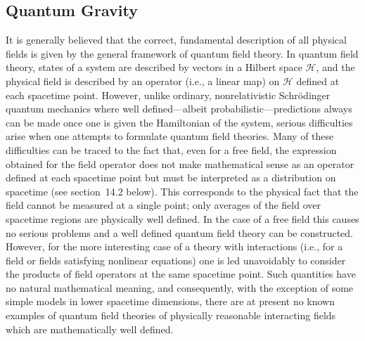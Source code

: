 
\subsection{Quantum Gravity}\label{sec:14.1}

It is generally believed that the correct, fundamental description of all physical
fields is given by the general framework of quantum field theory. In quantum field
theory, states of a system are described by vectors in a Hilbert space \(\mathcal H\), and the
physical field is described by an operator (i.e., a linear map) on \(\mathcal H\) defined at each
spacetime point. However, unlike ordinary, nonrelativistic Schrödinger quantum
mechanics where well defined---albeit probabilistic---predictions always can be
made once one is given the Hamiltonian of the system, serious difficulties arise when
one attempts to formulate quantum field theories. Many of these difficulties can be
traced to the fact that, even for a free field, the expression obtained for the field
operator does not make mathematical sense as an operator defined at each spacetime
point but must be interpreted as a distribution on spacetime (see section~14.2 below).
This corresponds to the physical fact that the field cannot be measured at a single
point; only averages of the field over spacetime regions are physically well defined.
In the case of a free field this causes no serious problems and a well defined quantum
field theory can be constructed. However, for the more interesting case of a theory
with interactions (i.e., for a field or fields satisfying nonlinear equations) one is led
unavoidably to consider the products of field operators at the same spacetime point.
Such quantities have no natural mathematical meaning, and consequently, with the
exception of some simple models in lower spacetime dimensions, there are at present
no known examples of quantum field theories of physically reasonable interacting
fields which are mathematically well defined.

